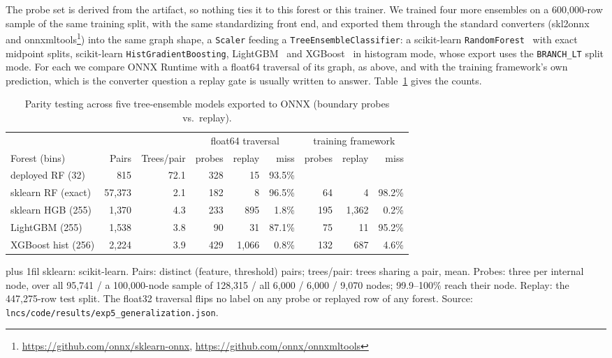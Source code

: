 \documentclass[runningheads]{llncs}
\newcommand{\tabnote}[1]{%
  \vspace{4pt}\par\noindent
  \begin{minipage}{\textwidth}%
    \footnotesize\parindent=0pt\leftskip=0pt\rightskip=0pt\parfillskip=0pt plus 1fil\relax
    #1%
  \end{minipage}}
\begin{document}
The probe set is derived from the artifact, so nothing ties it to this forest or this trainer. We trained four more ensembles on a 600{,}000-row sample of the same training split, with the same standardizing front end, and exported them through the standard converters (skl2onnx and onnxmltools\footnote{\url{https://github.com/onnx/sklearn-onnx}, \url{https://github.com/onnx/onnxmltools}}) into the same graph shape, a \texttt{Scaler} feeding a \texttt{TreeEnsembleClassifier}: a scikit-learn \texttt{RandomForest}~\cite{pedregosa2011sklearn} with exact midpoint splits, scikit-learn \texttt{HistGradientBoosting}, LightGBM~\cite{ke2017lightgbm} and XGBoost~\cite{chen2016xgboost} in histogram mode, whose export uses the \texttt{BRANCH\_LT} split mode. For each we compare ONNX Runtime with a float64 traversal of its graph, as above, and with the training framework's own prediction, which is the converter question a replay gate is usually written to answer. Table~\ref{tab:generalize} gives the counts.

\begin{table}[htbp]
  \caption{Parity testing across five tree-ensemble models exported to ONNX (boundary probes vs.\ replay).}
  \label{tab:generalize}
  \centering
  \footnotesize
  \setlength{\tabcolsep}{3pt}
  \begin{tabular}{l r r r r r r r r}
    \toprule
     & & & \multicolumn{3}{c}{float64 traversal} & \multicolumn{3}{c}{training framework} \\
    \cmidrule(lr){4-6}\cmidrule(lr){7-9}
    Forest (bins) & Pairs & Trees/pair & probes & replay & miss & probes & replay & miss \\
    \midrule
    deployed RF (32)       & 815      & 72.1 & 328 & 15      & 93.5\% &     &         &        \\
    sklearn RF (exact)     & 57{,}373 & 2.1  & 182 & 8       & 96.5\% & 64  & 4       & 98.2\% \\
    sklearn HGB (255)      & 1{,}370  & 4.3  & 233 & 895     & 1.8\%  & 195 & 1{,}362 & 0.2\%  \\
    LightGBM (255)                & 1{,}538  & 3.8  & 90  & 31      & 87.1\% & 75  & 11      & 95.2\% \\
    XGBoost hist (256)            & 2{,}224  & 3.9  & 429 & 1{,}066 & 0.8\%  & 132 & 687     & 4.6\%  \\
    \bottomrule
  \end{tabular}
  \tabnote{sklearn: scikit-learn. Pairs: distinct (feature, threshold) pairs; trees/pair: trees sharing a pair, mean. Probes: three per internal node, over all 95{,}741 / a 100{,}000-node sample of 128{,}315 / all 6{,}000 / 6{,}000 / 9{,}070 nodes; 99.9--100\% reach their node. Replay: the 447{,}275-row test split. The float32 traversal flips no label on any probe or replayed row of any forest. Source: \texttt{lncs/code/results/exp5\_generalization.json}.}
\end{table}
\end{document}
